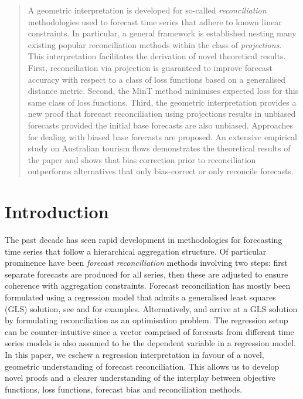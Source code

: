 \documentclass[12pt]{article}
\theoremstyle{definition}
\def\spacingset#1{\renewcommand{\baselinestretch}%
    {#1}\small\normalsize} \spacingset{1}
\begin{document}
\begin{abstract}
\spacingset{1.45}
  A geometric interpretation is developed for so-called \emph{reconciliation} methodologies used to forecast time series that adhere to known linear constraints. In particular, a general framework is established nesting many existing popular reconciliation methods within the class of \emph{projections}. This interpretation facilitates the derivation of novel theoretical results. First, reconciliation via projection is guaranteed to improve forecast accuracy with respect to a class of loss functions based on a generalised distance metric. {\color{blue} Second, the MinT method minimises expected loss for this same class of loss functions.}  Third, the geometric interpretation provides a new proof that forecast reconciliation using projections results in unbiased forecasts provided the initial base forecasts are also unbiased.  Approaches for dealing with biased base forecasts are proposed. An extensive empirical study on Australian tourism flows {\color{blue} demonstrates the theoretical results of the paper and shows that bias correction prior to reconciliation} outperforms alternatives that only bias-correct or only reconcile forecasts.

\end{abstract}


\newpage
\spacingset{1.45} %

\section{Introduction}\label{sec:intro}

The past decade has seen rapid development in methodologies for forecasting time series that follow a hierarchical aggregation structure. Of particular prominence have been \emph{forecast reconciliation} methods involving two steps: first separate forecasts are produced for all series, then these are adjusted to ensure coherence with aggregation constraints. Forecast reconciliation has mostly been formulated using a regression model {\color{blue} that admits a generalised least squares (GLS) solution}, see \citet{Hyndman2011} and \citet{WicEtAl2019} for examples. {\color{blue} Alternatively, \cite{VanErven2015a} and \cite{NysEtAl2019} arrive at a GLS solution by formulating reconciliation as an optimisation problem}.  The regression setup can be counter-intuitive since a vector comprised of forecasts from different time series models is also assumed to be the dependent variable in a regression model. In this paper, we eschew a regression interpretation in favour of a novel, geometric understanding of forecast reconciliation. This allows us to develop novel proofs and a clearer understanding of the interplay between {\color{blue} objective functions, loss functions, }forecast bias and reconciliation methods.
\end{document}
